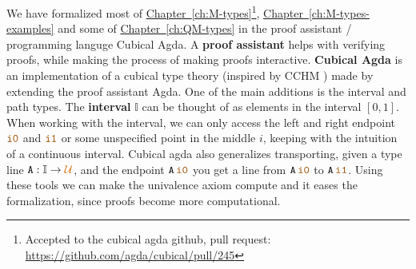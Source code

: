 \documentclass[twoside,11pt,openright]{report}
\theoremstyle{plain} %
\theoremstyle{definition}
\theoremstyle{remark}
\newcommand*{\chapterref}[1]{\hyperref[ch:#1]{Chapter~\ref*{ch:#1}}}
\newcommand*{\universe}[1]{\textcolor{orange!80!black}{#1}}
\newcommand*{\constant}[1]{\textcolor{orange!60!black}{\ensuremath{\mathtt{#1}}}}
\newcommand*{\typeformer}[1]{\ensuremath{\mathtt{#1}}}
\begin{document}
We have formalized most of \chapterref{M-types}\footnote{Accepted to the cubical agda github, pull request: \url{https://github.com/agda/cubical/pull/245}}, \chapterref{M-types-examples} and some of \chapterref{QM-types} in the proof assistant / programming languge Cubical Agda. A \textbf{proof assistant} helps with verifying proofs, while making the process of making proofs interactive. \textbf{Cubical Agda} \cite{cubicalagda} is an implementation of a cubical type theory (inspired by CCHM \cite{DBLP:CCHM}) made by extending the proof assistant Agda. One of the main additions is the interval and path types. The \textbf{interval} \(\mathbb{I}\) can be thought of as elements in the interval \([0,1]\). When working with the interval, we can only access the left and right endpoint \(\constant{i0}\) and \(\constant{i1}\) or some unspecified point in the middle \(i\), keeping with the intuition of a continuous interval. Cubical agda also generalizes transporting, given a type line \(\typeformer{A} : \mathbb{I} \rightarrow \universe{\mathcal{U}}\), and the endpoint \(\typeformer{A}\,\constant{i0}\) you get a line from \(\typeformer{A}\,\constant{i0}\) to \(\typeformer{A}\,\constant{i1}\). Using these tools we can make the univalence axiom compute and it eases the formalization, since proofs become more computational.
\end{document}
